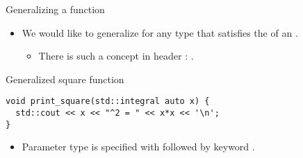 \begin{frame}[t,fragile]{Generalizing a function}
\begin{itemize}
  \item We would like to generalize for any type that satisfies the
         of an .
    \begin{itemize}
      \item There is such a concept in header : .
    \end{itemize}
\end{itemize}

\begin{block}{Generalized square function}
\begin{lstlisting}
void print_square(std::integral auto x) {
  std::cout << x << "^2 = " << x*x << '\n';
}
\end{lstlisting}
\end{block}

\begin{itemize}
  \item Parameter type is specified with  
        followed by keyword .


\end{itemize}

\end{frame}

